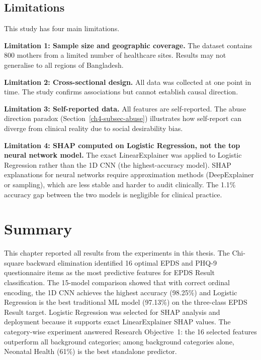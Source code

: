 \subsection{Limitations}
\label{ch4-subsec-limitations}

This study has four main limitations.

\textbf{Limitation 1: Sample size and geographic coverage.}
The dataset contains 800 mothers from a limited number of healthcare sites.
Results may not generalise to all regions of Bangladesh.

\textbf{Limitation 2: Cross-sectional design.}
All data was collected at one point in time.
The study confirms associations but cannot establish causal direction.

\textbf{Limitation 3: Self-reported data.}
All features are self-reported.
The abuse direction paradox (Section~\ref{ch4-subsec-abuse}) illustrates how self-report can diverge from clinical reality due to social desirability bias.

\textbf{Limitation 4: SHAP computed on Logistic Regression, not the top neural network model.}
The exact LinearExplainer was applied to Logistic Regression rather than the 1D CNN (the highest-accuracy model).
SHAP explanations for neural networks require approximation methods (DeepExplainer or sampling), which are less stable and harder to audit clinically.
The 1.1\% accuracy gap between the two models is negligible for clinical practice.

\section{Summary}
\label{ch4-sec-summary}

This chapter reported all results from the experiments in this thesis.
The Chi-square backward elimination identified 16 optimal EPDS and PHQ-9 questionnaire items as the most predictive features for EPDS Result classification.
The 15-model comparison showed that with correct ordinal encoding, the 1D CNN achieves the highest accuracy (98.25\%) and Logistic Regression is the best traditional ML model (97.13\%) on the three-class EPDS Result target.
Logistic Regression was selected for SHAP analysis and deployment because it supports exact LinearExplainer SHAP values.
The category-wise experiment answered Research Objective~1: the 16 selected features outperform all background categories; among background categories alone, Neonatal Health (61\%) is the best standalone predictor.

